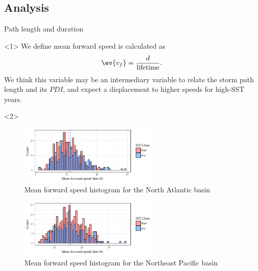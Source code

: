 \subsection{Analysis}
\begin{frame}{Path length and duration}
	\begin{onlyenv}
		We define mean forward speed is calculated as
		\begin{align}
			\ev{v_{f}} = \frac{d}{\text{lifetime}} .
		\end{align}
		We think this variable may be an intermediary variable to relate the storm path length and its $PDI$, and expect a displacement to higher speeds for high-SST years.
	\end{onlyenv}



	\begin{onlyenv}
		\begin{figure}[H]
			\centering
			\includegraphics[width=0.6\textwidth]{images/natl-forward-speed}
			\caption{Mean forward speed histogram for the North Atlantic basin}
			\label{fig:natl-forward-speed}
		\end{figure}

		\begin{figure}[H]
			\centering
			\includegraphics[width=0.6\textwidth]{images/epac-forward-speed}
			\caption{Mean forward speed histogram for the Northeast Pacific basin}
			\label{fig:epac-forward-speed}
		\end{figure}
	\end{onlyenv}

\end{frame}

